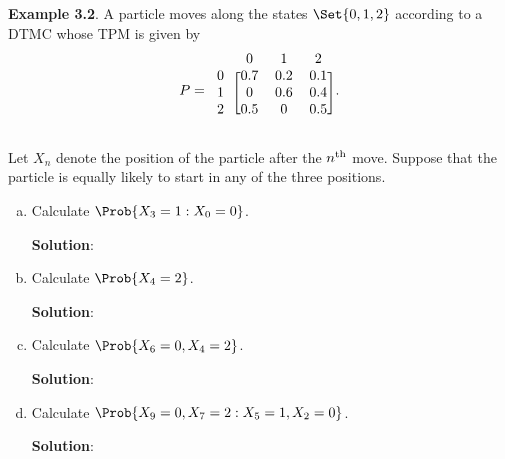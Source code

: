 \begin{Example}
    \textbf{Example 3.2}. A particle moves along the states $ \Set{0,1,2} $ according to a DTMC whose TPM
    is given by
    \[ P=\begin{blockarray}{ccccc}
            & 0 & 1 & 2 \\
            \begin{block}{c[cccc]}
                0 & 0.7  & 0.2  & 0.1 \\
                1 & 0 & 0.6 & 0.4 \\
                2 & 0.5 & 0 & 0.5 \\
            \end{block}
        \end{blockarray}. \]

    Let $X_n$ denote the position of the particle after the $n\textsuperscript{th}$ move. Suppose that the particle is
    equally likely to start in any of the three positions.
    \begin{enumerate}[(a)]
        \item Calculate $ \Prob{X_3=1\given X_0=0} $.

              \textbf{Solution}:
        \item Calculate $ \Prob{X_4=2} $.

              \textbf{Solution}:
        \item Calculate $ \Prob{X_6=0,X_4=2} $.

              \textbf{Solution}:
        \item Calculate $ \Prob{X_9=0,X_7=2\given X_5=1,X_2=0} $.

              \textbf{Solution}:
    \end{enumerate}
\end{Example}
